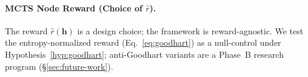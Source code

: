 \paragraph{MCTS Node Reward (Choice of $\hat{r}$).}
The reward $\hat{r}(\mathbf{h})$ is a design choice; the framework is reward-agnostic. We test the entropy-normalized reward (Eq.~\ref{eq:goodhart}) as a null-control under Hypothesis~\ref{hyp:goodhart}; anti-Goodhart variants are a Phase~B research program (§\ref{sec:future-work}).
